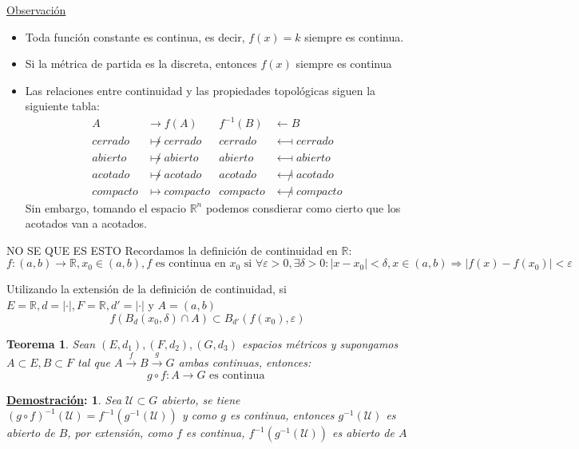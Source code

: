 \documentclass[10pt,a4paper,openright]{book}
\theoremstyle{break}
\newtheorem*{theo}{Teorema}
\newtheorem*{demo}{\underline{Demostración}:}
\begin{document}
\underline{Observación}

\begin{itemize}
\item Toda función constante es continua, es decir, $f(x)=k$ siempre es continua.
\item Si la métrica de partida es la discreta, entonces $f(x)$ siempre es continua
\item Las relaciones entre continuidad y las propiedades topológicas siguen la siguiente tabla:
\begin{align*}
A &\longrightarrow f(A) & f^{-1}(B) & \longleftarrow B\\
cerrado & \not\longmapsto cerrado  & cerrado & \longmapsfrom cerrado  \\
abierto & \not\longmapsto abierto & abierto & \longmapsfrom abierto \\
acotado & \not\longmapsto acotado & acotado & \not\longmapsfrom acotado \\
compacto & \longmapsto compacto & compacto & \not\longmapsfrom compacto
\end{align*}
Sin embargo, tomando el espacio $\mathbb{R}^n$ podemos consdierar como cierto que los acotados van a acotados.
\end{itemize}

NO SE QUE ES ESTO
Recordamos la definición de continuidad en $\mathbb{R}$:
$$f : (a,b) \to \mathbb{R}, x_0 \in (a,b), f \mbox{ es continua en } x_0 \mbox{ si } \forall \varepsilon > 0, \exists \delta > 0 : |x - x_0| < \delta , x\in (a,b) \Rightarrow |f(x) - f(x_0)| < \varepsilon  $$

Utilizando la extensión de la definición de continuidad, si $E = \mathbb{R}, d = | \cdot |,F = \mathbb{R}, d' = | \cdot | $ y $A = (a,b)$
$$f(B_d(x_0, \delta) \cap A) \subset B_{d'} (f(x_0), \varepsilon)$$
 
 
\begin{theo}
Sean $(E, d_1), (F, d_2), (G, d_3)$ espacios métricos y supongamos $A \subset E, B \subset F$ tal que $A \xrightarrow{f} B \xrightarrow{g} G$ ambas continuas, entonces:
$$g \circ f : A \to G \mbox{ es continua }$$
\end{theo}

\begin{demo}
Sea $\mathcal{U} \subset G$ abierto, se tiene $(g \circ f)^{-1} (\mathcal{U}) = f^{-1}(g^{-1} (\mathcal{U}))$ y como $g$ es continua, entonces $g^{-1}(\mathcal{U})$ es abierto de $B$, por extensión, como $f$ es continua, $f^{-1}(g^{-1} (\mathcal{U}))$ es abierto de $A$
\end{demo}
\end{document}
